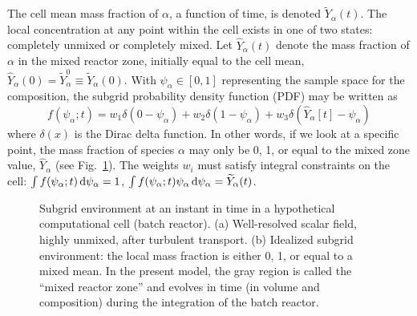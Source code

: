 The cell mean mass fraction of $\alpha$, a function of time, is denoted $\widetilde{Y}_\alpha(t)$. The local concentration at any point within the cell exists in one of two states: completely unmixed or completely mixed.  Let $\hat{Y}_\alpha(t)$ denote the mass fraction of $\alpha$ in the mixed reactor zone, initially equal to the cell mean, $\hat{Y}_\alpha(0) = \widetilde{Y}_{\alpha}^0 \equiv \widetilde{Y}_{\alpha}(0)$.  With $\psi_\alpha \in [0,1]$ representing the sample space for the composition, the subgrid probability density function (PDF) may be written as
\begin{equation}
\label{eq:pdf}
f(\psi_\alpha;t) = w_1 \delta(0-\psi_\alpha) + w_2 \delta(1-\psi_\alpha) + w_3 \delta(\hat{Y}_\alpha[t] - \psi_\alpha)
\end{equation}
where $\delta(x)$ is the Dirac delta function.  In other words, if we look at a specific point, the mass fraction of species $\alpha$ may only be 0, 1, or equal to the mixed zone value, $\hat{Y}_\alpha$ (see Fig.~\ref{fig_subgrid_environment}).  The weights $w_i$ must satisfy integral constraints on the cell: $\int f(\psi_\alpha;t) \,\mathrm{d} \psi_\alpha = 1$, $\int f(\psi_\alpha;t) \psi_\alpha \,\mathrm{d} \psi_\alpha = \widetilde{Y}_\alpha(t)$.

\begin{figure}
\begin{center}
\end{center}
\caption[Idealized subgrid environment for batch reactor model]{Subgrid environment at an instant in time in a hypothetical computational cell (batch reactor). (a) Well-resolved scalar field, highly unmixed, after turbulent transport. (b) Idealized subgrid environment: the local mass fraction is either 0, 1, or equal to a mixed mean.  In the present model, the gray region is called the ``mixed reactor zone'' and evolves in time (in volume and composition) during the integration of the batch reactor.}
\label{fig_subgrid_environment}
\end{figure}


